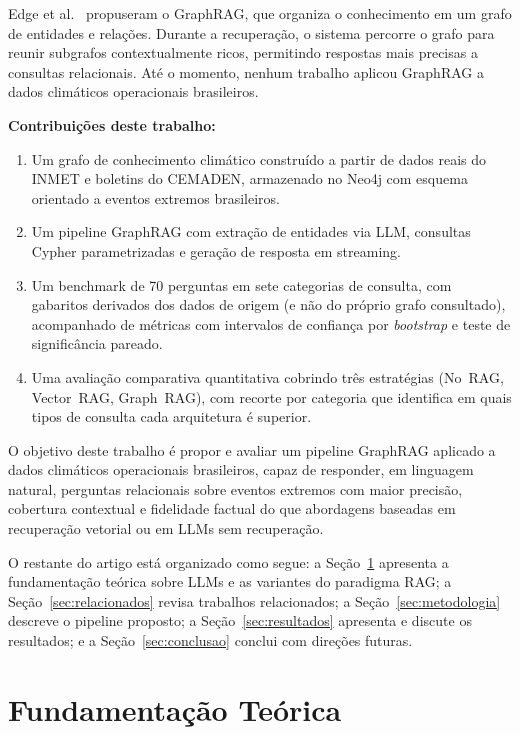 \documentclass[conference]{IEEEtran}
\begin{document}
Edge et al.~\cite{edge2024graphrag} propuseram o GraphRAG, que
organiza o conhecimento em um grafo de entidades e relações.
Durante a recuperação, o sistema percorre o grafo para reunir
subgrafos contextualmente ricos, permitindo respostas mais precisas
a consultas relacionais.
Até o momento, nenhum trabalho aplicou GraphRAG a dados climáticos
operacionais brasileiros.

\textbf{Contribuições deste trabalho:}
\begin{enumerate}
  \item Um grafo de conhecimento climático construído a partir de
        dados reais do INMET e boletins do CEMADEN, armazenado no
        Neo4j com esquema orientado a eventos extremos brasileiros.
  \item Um pipeline GraphRAG com extração de entidades via LLM,
        consultas Cypher parametrizadas e geração de resposta em
        streaming.
  \item Um benchmark de 70 perguntas em sete categorias de consulta,
        com gabaritos derivados dos dados de origem (e não do próprio
        grafo consultado), acompanhado de métricas com intervalos de
        confiança por \textit{bootstrap} e teste de significância
        pareado.
  \item Uma avaliação comparativa quantitativa cobrindo três
        estratégias (No~RAG, Vector~RAG, Graph~RAG), com recorte por
        categoria que identifica em quais tipos de consulta cada
        arquitetura é superior.
\end{enumerate}

O objetivo deste trabalho é propor e avaliar um pipeline GraphRAG
aplicado a dados climáticos operacionais brasileiros, capaz de
responder, em linguagem natural, perguntas relacionais sobre eventos
extremos com maior precisão, cobertura contextual e fidelidade
factual do que abordagens baseadas em recuperação vetorial ou em
LLMs sem recuperação.

O restante do artigo está organizado como segue:
a Seção~\ref{sec:fundamentacao} apresenta a fundamentação teórica
sobre LLMs e as variantes do paradigma RAG;
a Seção~\ref{sec:relacionados} revisa trabalhos relacionados;
a Seção~\ref{sec:metodologia} descreve o pipeline proposto;
a Seção~\ref{sec:resultados} apresenta e discute os resultados;
e a Seção~\ref{sec:conclusao} conclui com direções futuras.

\section{Fundamentação Teórica}
\label{sec:fundamentacao}
\end{document}
